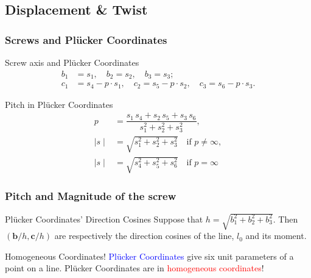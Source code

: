 \subsection{Displacement \& Twist}
\begin{frame}
	\frametitle{Screws and Pl{\"u}cker Coordinates}
	\begin{block}{Screw axis and Pl{\"u}cker Coordinates}
		\begin{align}
			b_1 &= s_1, \quad b_2 = s_2, \quad b_3 = s_3; \\
			c_1 &= s_4 - p \cdot s_1, \quad c_2 = s_5-p\cdot s_2, \quad c_3 = s_6 - p\cdot s_3.
		\end{align}
	\end{block}
	\begin{block}{Pitch in Pl{\"u}cker Coordinates}
		\begin{align}
			p &= \dfrac{s_1 \, s_4 + s_2 \, s_5 + s_3 \, s_6}{{s_1^2 + s_2^2 + s_3^2}}, \\
			\mid s \mid &= \sqrt{s_1^2 + s_2^2 + s_3^2} \quad \text{if } p \neq \infty, \\
			\mid s \mid &= \sqrt{s_4^2 + s_5^2 + s_6^2} \quad \text{if } p = \infty
		\end{align}
	\end{block}
\end{frame}


\begin{frame}
	\frametitle{Pitch and Magnitude of the screw}	
	\begin{block}{Pl{\"u}cker Coordinates' Direction Cosines}
		Suppose that 
		$h = \sqrt{b_1^2+b_2^2+b_3^2}$.
		Then $(\bm{b}/h, \bm{c}/h)$ are respectively the direction cosines of the line, $l_0$ and its moment.
	\end{block}
	\begin{block}{ Homogeneous Coordinates!}
		\textcolor{blue}{Pl{\"u}cker Coordinates} give six unit parameters of a point on a line. Pl{\"u}cker Coordinates are in \textcolor{red}{homogeneous coordinates}!
	\end{block}
\end{frame}

